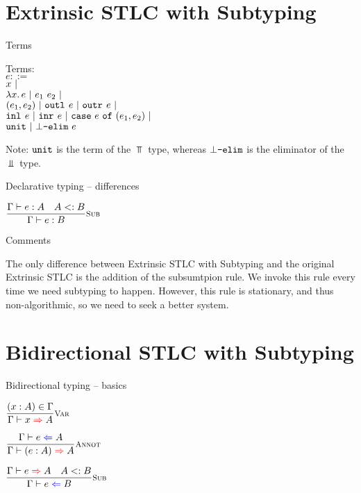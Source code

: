 \documentclass{beamer}
\begin{document}
\section{Extrinsic STLC with Subtyping}


\begin{frame}{Terms}

Terms: \\
$e ::=$ \\
\qquad $x \ |\ $ \\
\qquad $\fun{x}{e} \pipe \app{e_1}{e_2} \pipe$ \\
\qquad $(e_1, e_2) \ |\  \texttt{outl}_{}\ e \ |\  \texttt{outr}_{}\ e \ |\ $ \\
\qquad $\texttt{inl}_{}\ e \ |\  \texttt{inr}_{}\ e \ |\  \texttt{case}\ e\ \texttt{of}\ (e_1, e_2) \ |\ $ \\
\qquad $\unit \pipe \botelim[e]$

\vspace{2em}

Note: $\texttt{unit}$ is the term of the $\Top$ type, whereas $\botelim$ is the eliminator of the $\Bot$ type.

\end{frame}

\begin{frame}{Declarative typing -- differences}

\begin{center}
  $\infrule[Sub]{\typing{e}{A} \quad \sidecond{\subtyping{A}{B}}}{\typing{e}{B}}$
\end{center}

\end{frame}

\begin{frame}{Comments}

The only difference between Extrinsic STLC with Subtyping and the original Extrinsic STLC is the addition of the subsumtpion rule. We invoke this rule every time we need subtyping to happen. However, this rule is stationary, and thus non-algorithmic, so we need to seek a better system.

\end{frame}

\section{Bidirectional STLC with Subtyping}

\begin{frame}{Bidirectional typing -- basics}

\begin{center}
  $\infrule[Var]{\sidecond{(x : A) \in \Gamma}}{\infer{x}{A}}$

  \vspace{2em}

  $\infrule[Annot]{\check{e}{A}}{\infer{\annot{e}{A}}{A}}$

  \vspace{2em}

  $\infrule[Sub]{\infer{e}{A} \quad \sidecond{\subtyping{A}{B}}}{\check{e}{B}}$
\end{center}

\end{frame}
\end{document}
